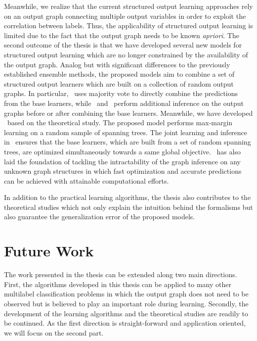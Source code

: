 {Meanwhile, we realize that the current structured output learning approaches rely on an output graph connecting multiple output variables in order to exploit the correlation between labels.
Thus, the applicability of structured output learning is limited due to the fact that the output graph needs to be known \textit{apriori}.
The second outcome of the thesis is that we have developed several new models for structured output learning which are no longer constrained by the availability of the output graph.
Analog but with significant differences to the previously established ensemble methods, the proposed models aim to combine a set of structured output learners which are built on a collection of random output graphs.
In particular, \mve\ uses majority vote to directly combine the predictions from the base learners, while \amm\ and \mam\ perform additional inference on the output graphs before or after combining the base learners.
Meanwhile, we have developed \rta\ based on the theoretical study.
The proposed model performs max-margin learning on a random sample of spanning trees.
The joint learning and inference in \rta\ ensures that the base learners, which are built from a set of random spanning trees, are optimized simultaneously towards a same global objective.
\rta\ has also laid the foundation of tackling the intractability of the graph inference on any unknown graph structures in which fast optimization and accurate predictions can be achieved with attainable computational efforts.

In addition to the practical learning algorithms, the thesis also contributes to the theoretical studies which not only explain the intuition behind the formalisms but also guarantee the generalization error of the proposed models.



\section{Future Work}

The work presented in the thesis can be extended along two main directions.
First, the algorithms developed in this thesis can be applied to many other multilabel classification problems in which the output graph does not need to be observed but is believed to play an important role during learning.
Secondly, the development of the learning algorithms and the theoretical studies are readily to be continued.
As the first direction is straight-forward and application oriented, we will focus on the second part.

}
